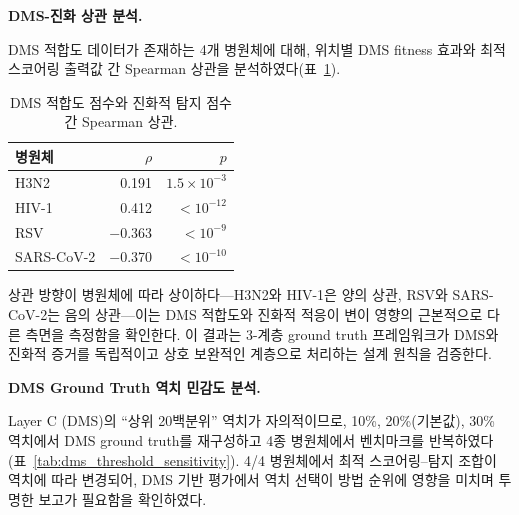 \textbf{DMS-진화 상관 분석.}
\label{subsec:dms_evolution_correlation}

DMS 적합도 데이터가 존재하는 4개 병원체에 대해, 위치별 DMS fitness 효과와 최적 스코어링 출력값 간 Spearman 상관을 분석하였다(표~\ref{tab:dms_evolution_correlation}).

\begin{table}[htbp]
\centering
\caption{DMS 적합도 점수와 진화적 탐지 점수 간 Spearman 상관.}
\label{tab:dms_evolution_correlation}
\begin{tabular}{lrr}
\toprule
병원체 & $\rho$ & $p$ \\
\midrule
H3N2       &  0.191 & $1.5 \times 10^{-3}$ \\
HIV-1      &  0.412 & $< 10^{-12}$ \\
RSV        & $-$0.363 & $< 10^{-9}$ \\
SARS-CoV-2 & $-$0.370 & $< 10^{-10}$ \\
\bottomrule
\end{tabular}
\end{table}

상관 방향이 병원체에 따라 상이하다---H3N2와 HIV-1은 양의 상관, RSV와 SARS-CoV-2는 음의 상관---이는 DMS 적합도와 진화적 적응이 변이 영향의 근본적으로 다른 측면을 측정함을 확인한다.
이 결과는 3-계층 ground truth 프레임워크가 DMS와 진화적 증거를 독립적이고 상호 보완적인 계층으로 처리하는 설계 원칙을 검증한다.


\textbf{DMS Ground Truth 역치 민감도 분석.}
\label{subsec:dms_threshold_sensitivity}

Layer C (DMS)의 ``상위 20백분위'' 역치가 자의적이므로, 10\%, 20\%(기본값), 30\% 역치에서 DMS ground truth를 재구성하고 4종 병원체에서 벤치마크를 반복하였다(표~\ref{tab:dms_threshold_sensitivity}).
4/4 병원체에서 최적 스코어링--탐지 조합이 역치에 따라 변경되어, DMS 기반 평가에서 역치 선택이 방법 순위에 영향을 미치며 투명한 보고가 필요함을 확인하였다.

